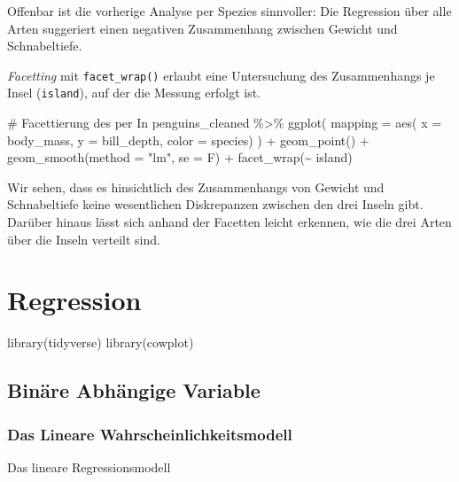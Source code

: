 \documentclass[
  a4paper,
  DIV=11,
  oneside]{scrreprt}
\newenvironment{Shaded}{\begin{snugshade}}{\end{snugshade}}
\newcommand{\FunctionTok}[1]{\textcolor[rgb]{0.28,0.35,0.67}{#1}}
\newcommand{\NormalTok}[1]{\textcolor[rgb]{0.00,0.23,0.31}{#1}}
\begin{document}
Offenbar ist die vorherige Analyse per Spezies sinnvoller: Die
Regression über alle Arten suggeriert einen negativen Zusammenhang
zwischen Gewicht und Schnabeltiefe.

\emph{Facetting} mit \texttt{facet\_wrap()} erlaubt eine Untersuchung
des Zusammenhangs je Insel (\texttt{island}), auf der die Messung
erfolgt ist.

\begin{Shaded}
\begin{Highlighting}[]
\NormalTok{\# Facettierung des per In}
\NormalTok{penguins\_cleaned \%\textgreater{}\%}
\NormalTok{  ggplot(}
\NormalTok{    mapping = aes(}
\NormalTok{      x = body\_mass, }
\NormalTok{      y = bill\_depth, }
\NormalTok{      color = species)}
\NormalTok{  ) +}
\NormalTok{  geom\_point() +}
\NormalTok{  geom\_smooth(method = "lm", se = F) +}
\NormalTok{  facet\_wrap(\textasciitilde{} island)}
\end{Highlighting}
\end{Shaded}

Wir sehen, dass es hinsichtlich des Zusammenhangs von Gewicht und
Schnabeltiefe keine wesentlichen Diskrepanzen zwischen den drei Inseln
gibt. Darüber hinaus lässt sich anhand der Facetten leicht erkennen, wie
die drei Arten über die Inseln verteilt sind.


\chapter{Regression}\label{sec-regression}

\begin{Shaded}
\begin{Highlighting}[]
\FunctionTok{library}\NormalTok{(tidyverse)}
\FunctionTok{library}\NormalTok{(cowplot)}
\end{Highlighting}
\end{Shaded}

\section{Binäre Abhängige
Variable}\label{binuxe4re-abhuxe4ngige-variable}

\subsection{Das Lineare Wahrscheinlichkeitsmodell}\label{sec-lpm}

Das lineare Regressionsmodell
\end{document}
